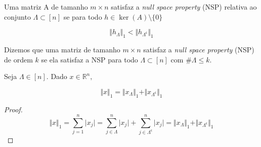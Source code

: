 \begin{definicao} Uma matriz A de tamanho $m \times n$ satisfaz a \textit{null space property} (NSP) relativa ao conjunto $\Lambda \subset [n]$ se para todo $h \in \ker(A) \setminus \lbrace 0 \rbrace$


$$ \Vert h_{\Lambda} \Vert_1 <  \Vert h_{\Lambda^{\mathsf{c}}} \Vert_1$$
\end{definicao}

\begin{definicao}
Dizemos que uma matriz de tamanho $m \times n$ satisfaz a \textit{null space property} (NSP) de ordem $k$ se ela satisfaz a NSP para todo $\Lambda \subset [n]$ com $\# \Lambda \leq k$.
\end{definicao}

\begin{lema}
Seja $\Lambda \in [n]$. Dado $x \in \mathbb{R}^n,$

$$ \Vert x \Vert_1 = \Vert x_{\Lambda} \Vert_1 + \Vert x_{\Lambda^{\mathsf{c}}} \Vert_1 $$
\end{lema}
\begin{proof} %
$$
\Vert x \Vert_1 = \sum_{j = 1}^n \vert x_j \vert
= \sum_{j \in \Lambda}^n \vert x_j \vert + \sum_{j \in \Lambda^{\mathsf{c}}}^n \vert x_j \vert
= \Vert x_{\Lambda} \Vert_1 + \Vert x_{\Lambda^{\mathsf{c}}} \Vert_1
$$
\end{proof}

